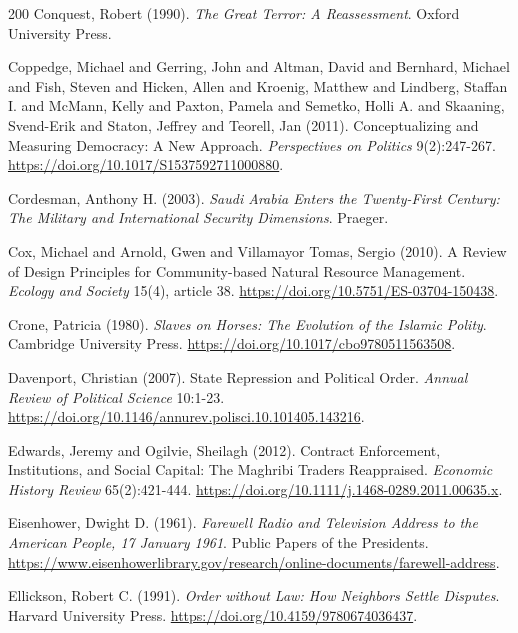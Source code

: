 \documentclass[11pt,letterpaper]{article}
\theoremstyle{definition}
\theoremstyle{remark}
\begin{document}
\begin{thebibliography}{200}
Conquest, Robert (1990). \emph{The Great Terror: A Reassessment}. Oxford University Press.

Coppedge, Michael and Gerring, John and Altman, David and Bernhard, Michael and Fish, Steven and Hicken, Allen and Kroenig, Matthew and Lindberg, Staffan I. and McMann, Kelly and Paxton, Pamela and Semetko, Holli A. and Skaaning, Svend-Erik and Staton, Jeffrey and Teorell, Jan (2011). Conceptualizing and Measuring Democracy: A New Approach. \emph{Perspectives on Politics} 9(2):247-267. \url{https://doi.org/10.1017/S1537592711000880}.

Cordesman, Anthony H. (2003). \emph{Saudi Arabia Enters the Twenty-First Century: The Military and International Security Dimensions}. Praeger.

Cox, Michael and Arnold, Gwen and Villamayor Tomas, Sergio (2010). A Review of Design Principles for Community-based Natural Resource Management. \emph{Ecology and Society} 15(4), article 38. \url{https://doi.org/10.5751/ES-03704-150438}.

Crone, Patricia (1980). \emph{Slaves on Horses: The Evolution of the Islamic Polity}. Cambridge University Press. \url{https://doi.org/10.1017/cbo9780511563508}.

Davenport, Christian (2007). State Repression and Political Order. \emph{Annual Review of Political Science} 10:1-23. \url{https://doi.org/10.1146/annurev.polisci.10.101405.143216}.

Edwards, Jeremy and Ogilvie, Sheilagh (2012). Contract Enforcement, Institutions, and Social Capital: The Maghribi Traders Reappraised. \emph{Economic History Review} 65(2):421-444. \url{https://doi.org/10.1111/j.1468-0289.2011.00635.x}.

Eisenhower, Dwight D. (1961). \emph{Farewell Radio and Television Address to the American People, 17 January 1961}. Public Papers of the Presidents. \url{https://www.eisenhowerlibrary.gov/research/online-documents/farewell-address}.

Ellickson, Robert C. (1991). \emph{Order without Law: How Neighbors Settle Disputes}. Harvard University Press. \url{https://doi.org/10.4159/9780674036437}.


\end{thebibliography}
\end{document}
